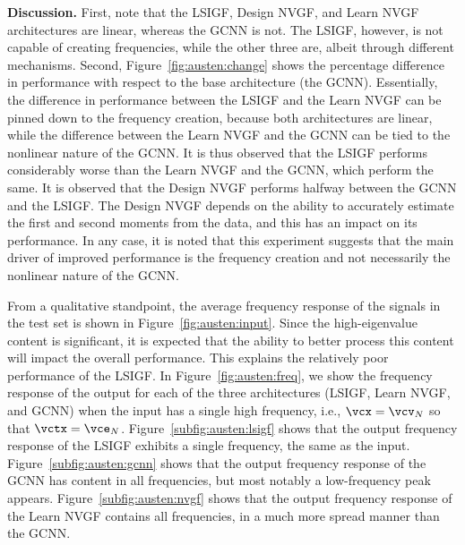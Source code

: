 \textbf{Discussion.} First, note that the LSIGF, Design NVGF, and Learn NVGF architectures are linear, whereas the GCNN is not. The LSIGF, however, is not capable of creating frequencies, while the other three are, albeit through different mechanisms. Second, Figure~\ref{fig:austen:change} shows the percentage difference in performance with respect to the base architecture (the GCNN). Essentially, the difference in performance between the LSIGF and the Learn NVGF can be pinned down to the frequency creation, because both architectures are linear, while the difference between the Learn NVGF and the GCNN can be tied to the nonlinear nature of the GCNN. It is thus observed that the LSIGF performs considerably worse than the Learn NVGF and the GCNN, which perform the same. It is observed that the Design NVGF performs halfway between the GCNN and the LSIGF. The Design NVGF depends on the ability to accurately estimate the first and second moments from the data, and this has an impact on its performance. In any case, it is noted that this experiment suggests that the main driver of improved performance is the frequency creation and not necessarily the nonlinear nature of the GCNN. %

From a qualitative standpoint, the average frequency response of the signals in the test set is shown in Figure~\ref{fig:austen:input}. Since the high-eigenvalue content is significant, it is expected that the ability to better process this content will impact the overall performance. This explains the relatively poor performance of the LSIGF. In Figure~\ref{fig:austen:freq}, we show the frequency response of the output for each of the three architectures (LSIGF, Learn NVGF, and GCNN) when the input has a single high frequency, i.e., $\vcx = \vcv_{N}$ so that $\vctx = \vce_{N}$. Figure~\ref{subfig:austen:lsigf} shows that the output frequency response of the LSIGF exhibits a single frequency, the same as the input. Figure~\ref{subfig:austen:gcnn} shows that the output frequency response of the GCNN has content in all frequencies, but most notably a low-frequency peak appears. Figure~\ref{subfig:austen:nvgf} shows that the output frequency response of the Learn NVGF contains all frequencies, in a much more spread manner than the GCNN.

